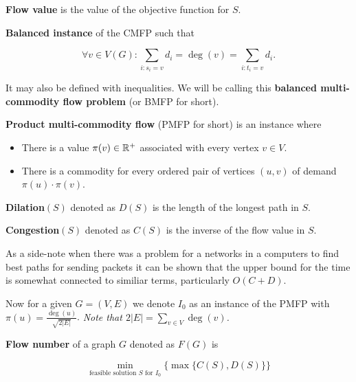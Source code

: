 \begin{defn}
	\textbf{Flow value} is the value of the objective function for $S$.
\end{defn}

\begin{defn}
	\textbf{Balanced instance} of the CMFP such that
	
	$$
	\forall v \in V(G) : \sum_{i: s_{i} = v} d_{i} = \deg(v) = \sum_{i: t_{i} = v} d_{i}.
	$$
\end{defn}

It may also be defined with inequalities. We will be calling this \textbf{balanced multi-commodity flow problem} (or BMFP for short).

\begin{defn}
	\textbf{Product multi-commodity flow} (PMFP for short) is an instance where
	
	\begin{itemize}
		\item There is a value $\pi(v) \in \mathbb{R}^+$ associated with every vertex $v \in V$.
		\item There is a commodity for every ordered pair of vertices $(u,v)$ of demand $\pi(u) \cdot \pi(v)$.
	\end{itemize}
\end{defn}

\begin{defn}
	\textbf{Dilation}$(S)$ denoted as $D(S)$ is the length of the longest path in $S$.
\end{defn}

\begin{defn}
	\textbf{Congestion}$(S)$ denoted as $C(S)$ is the inverse of the flow value in $S$.
\end{defn}

As a side-note when there was a problem for a networks in a computers to find best paths for sending packets it can be shown that the upper bound for the time is somewhat connected to similiar terms, particularly $O(C + D)$.

Now for a given $G = (V,E)$ we denote $I_{0}$ as an instance of the PMFP with $\pi(u) = \frac{\deg(u)}{\sqrt{2|E|}}$. \textit{Note that $2|E| = \sum_{v \in V} \deg(v)$.}

\begin{defn}
	\textbf{Flow number} of a graph $G$ denoted as $F(G)$ is
	
	$$
	\min_{\text{feasible solution } S \text{ for } I_{0}} \{ \max \{ C(S), D(S) \} \}
	$$
\end{defn}

